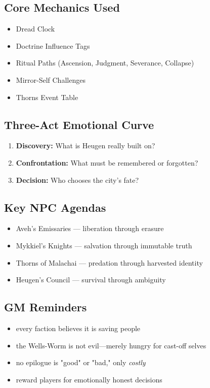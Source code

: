 \documentclass[11pt]{book}
\begin{document}
\subsection{Core Mechanics Used}
\begin{itemize}
    \item Dread Clock
    \item Doctrine Influence Tags
    \item Ritual Paths (Ascension, Judgment, Severance, Collapse)
    \item Mirror-Self Challenges
    \item Thorns Event Table
\end{itemize}

\subsection{Three-Act Emotional Curve}
\begin{enumerate}
    \item \textbf{Discovery:} What is Heugen really built on?  
    \item \textbf{Confrontation:} What must be remembered or forgotten?  
    \item \textbf{Decision:} Who chooses the city's fate?  
\end{enumerate}

\subsection{Key NPC Agendas}
\begin{itemize}[leftmargin=*]
    \item Aveh's Emissaries --- liberation through erasure  
    \item Mykkiel's Knights --- salvation through immutable truth  
    \item Thorns of Malachai --- predation through harvested identity  
    \item Heugen's Council --- survival through ambiguity  
\end{itemize}

\subsection{GM Reminders}
\begin{itemize}
    \item every faction believes it is saving people  
    \item the Wells-Worm is not evil---merely hungry for cast-off selves  
    \item no epilogue is "good" or "bad," only \emph{costly}  
    \item reward players for emotionally honest decisions  
\end{itemize}
\end{document}
